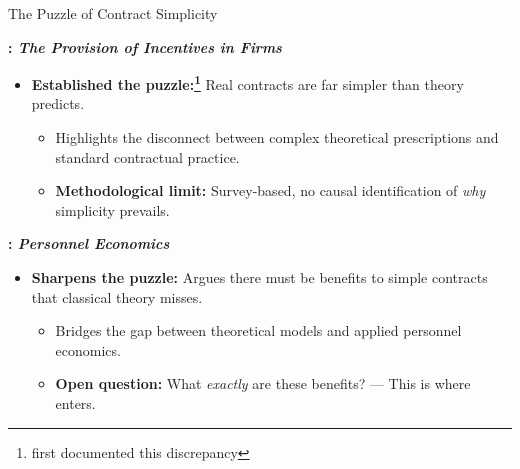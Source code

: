 \documentclass{beamer}
\begin{document}
\begin{frame}{The Puzzle of Contract Simplicity}

    \textbf{\textcite{Prendergast1999}: \textit{The Provision of Incentives in Firms}}

    \smallskip
    
    \begin{itemize}
    \setlength{\itemsep}{4pt}
        \item \textbf{Established the puzzle:\footnote{\textcite{Baker1988} first documented this discrepancy}} Real contracts are far simpler than theory predicts.
        \begin{itemize}
        \setlength{\itemsep}{3pt}
        \item Highlights the disconnect between complex theoretical prescriptions and standard contractual practice.
        \item \textbf{Methodological limit:} Survey-based, no causal identification of \emph{why} simplicity prevails.
        
        \end{itemize}
    \end{itemize}

    \medskip
    
    \textbf{\textcite{Lazear2007}: \textit{Personnel Economics}}

    \smallskip
    
    \begin{itemize}
    \setlength{\itemsep}{4pt}
        \item \textbf{Sharpens the puzzle:} Argues there must be benefits to simple contracts that classical theory misses.
        \begin{itemize}
        \setlength{\itemsep}{3pt}
        \item Bridges the gap between theoretical models and applied personnel economics.
        \item \textbf{Open question:} What \emph{exactly} are these benefits? --- This is where \textcite{Herweg2010} enters.
        \end{itemize}
    \end{itemize}
    
\end{frame}
\end{document}
